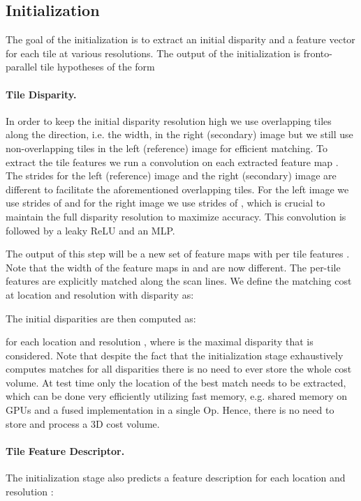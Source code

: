 \documentclass[final]{cvpr}
\begin{document}
\subsection{Initialization}
\label{sec:initialization}
The goal of the initialization is to extract an initial disparity  and a feature vector  for each tile at various resolutions. The output of the initialization is fronto-parallel tile hypotheses of the form 

\paragraph{Tile Disparity.} 
In order to keep the initial disparity resolution high we use overlapping tiles along the  direction, i.e. the width, in the right (secondary) image but we still use non-overlapping tiles in the left (reference) image for efficient matching.
To extract the tile features we run a  convolution on each extracted feature map . The strides for the left (reference) image and the right (secondary) image are different to facilitate the aforementioned overlapping tiles. For the left image we use strides of  and for the right image we use strides of , which is crucial to maintain the full disparity resolution to maximize accuracy. This convolution is followed by a leaky ReLU and an MLP.

The output of this step will be a new set of feature maps   with per tile features . Note that the width of the feature maps in  and  are now different. The per-tile features are explicitly matched along the scan lines. We define the matching cost  at location  and resolution  with disparity  as:

The initial disparities are then computed as:

for each  location and resolution , where  is the maximal disparity that is considered. Note that despite the fact that the initialization stage exhaustively computes matches for all disparities there is no need to ever store the whole cost volume. At test time only the location of the best match needs to be extracted, which can be done very efficiently utilizing fast memory, e.g. shared memory on GPUs and a fused implementation in a single Op. Hence, there is no need to store and process a 3D  cost volume.

\paragraph{Tile Feature Descriptor.} The initialization stage also predicts a feature description  for each  location and resolution :
\end{document}
